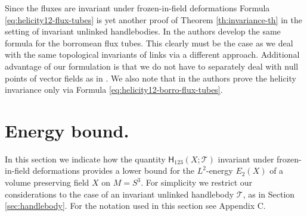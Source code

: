 \documentclass[12pt]{article}
\newcommand{\no}{\noindent}
\begin{document}
  Since the fluxes are invariant under frozen-in-field deformations Formula \eqref{eq:helicity12-flux-tubes}
  is yet another proof of Theorem \ref{th:invariance-th} in the setting of invariant unlinked handlebodies.
  In \cite{Laurence-Stredulinsky00b} the authors develop the same formula for the borromean flux tubes.
  This clearly must be the case as we deal with the same topological 
  invariants of links via a different approach. Additional advantage 
  of our formulation is that we do not have to separately 
  deal with null points of vector fields as in \cite{Laurence-Stredulinsky00b}. We also note that 
  in  \cite{Laurence-Stredulinsky00b} the authors prove the helicity invariance only via Formula \eqref{eq:helicity12-borro-flux-tubes}.



\section{Energy bound.}\label{sec:energy}

\no In this section we indicate how the quantity $\mathsf{H}_{123}(X;\mathcal{T})$ invariant under frozen-in-field deformations provides a lower bound for the  $L^2$-energy $E_2(X)$ of a volume preserving field $X$ on $M=S^3$. For simplicity we restrict our considerations to the case of an invariant unlinked  handlebody  $\mathcal{T}$, as in Section \ref{sec:handlebody}. For the notation used in this section see Appendix C.
\end{document}
